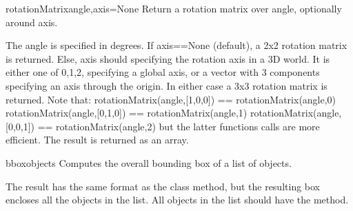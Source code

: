 \begin{funcdesc}{rotationMatrix}{angle,axis=None}
Return a rotation matrix over angle, optionally around axis.

The angle is specified in degrees.
If axis==None (default), a 2x2 rotation matrix is returned.
Else, axis should specifying the rotation axis in a 3D world. It is either
one of 0,1,2, specifying a global axis, or a vector with 3 components
specifying an axis through the origin.
In either case a 3x3 rotation matrix is returned.
Note that:
rotationMatrix(angle,[1,0,0]) == rotationMatrix(angle,0) 
rotationMatrix(angle,[0,1,0]) == rotationMatrix(angle,1) 
rotationMatrix(angle,[0,0,1]) == rotationMatrix(angle,2)
but the latter functions calls are more efficient.
The result is returned as an array.
\end{funcdesc}

   
\begin{funcdesc}{bbox}{objects}
Computes the overall bounding box of a list of objects.

The result has the same format as the  class  method, but the resulting box encloses all the objects in the list. All objects in the list should have the  method.
\end{funcdesc}



